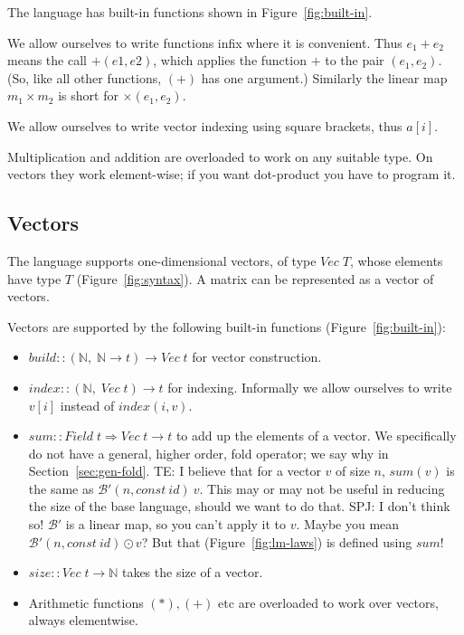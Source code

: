 \documentclass[sigplan,review]{acmart}
\renewcommand{\to}{\rightarrow}    %
\newcommand{\buildfun}{\mathit{build}}
\newcommand{\sumfunname}{\mathit{sum}}   %
\newcommand{\sumfun}[1]{\sumfunname(#1)}   %
\newcommand{\sizefun}{size}
\newcommand{\deltafun}{\delta}
\newcommand{\indexfunname}{\mathit{index}}
\newcommand{\indexfun}[2]{\indexfunname(#2,#1)} %
\renewcommand{\vector}[1]{\mathit{Vec}\;#1}
\newcommand{\nat}{\mathbb{N}}        %
\newcommand{\darrow}{\Rightarrow}    %
\newcommand{\lmapply}{\odot}   %
\newcommand{\lmcomp}{\,\circ\,}   %
\newcommand{\lmpair}{\times}         %
\newcommand{\lmbuildt}{\mathcal B'}             %
\newcommand{\simon}[1]{{\color{red}SPJ: #1}}
\newcommand{\tom}[1]{{\color{red}TE: #1}}
\begin{document}
The language has built-in functions shown in Figure~\ref{fig:built-in}.

We allow ourselves to write functions infix where it is convenient.
Thus $e_1 + e_2$ means the call $+(e1,e2)$, which applies the function $+$ to
the pair $(e_1,e_2)$.  (So, like all other functions, $(+)$ has one argument.)
Similarly the linear map $m_1 \lmpair m_2$ is short for $\lmpair(e_1,e_2)$.

We allow ourselves to write vector indexing using square brackets, thus $a[i]$.

Multiplication and addition are overloaded to work on any suitable type.
On vectors they work element-wise; if you want dot-product you have to program it.


\subsection{Vectors}

The language supports one-dimensional vectors, of type $\vector{T}$,
whose elements have type $T$ (Figure~\ref{fig:syntax}).
A matrix can be represented as a vector of vectors.

Vectors are supported by the following built-in functions (Figure~\ref{fig:built-in}):
\begin{itemize}
\item $\buildfun :: (\nat,\; \nat \to t) \to \vector{t}$ for vector construction.
\item $\indexfunname :: (\nat,\; \vector{t}) \to t$ for indexing.  Informally we allow ourselves to write
  $v[i]$ instead of $\indexfun{v}{i}$.
\item $\sumfunname :: Field \; t \darrow \vector{t} \to t$ to add up the elements of a vector.
We specifically do not have a general, higher order, fold operator;
we say why in Section~\ref{sec:gen-fold}.
  \tom{I believe that for a vector $v$ of size $n$, $\sumfun{v}$ is the
    same as $\lmbuildt(n, const~ id)~ v$.  This may or may not be useful
    in reducing the size of the base language, should we want to do that.}
  \simon{I don't think so!  $\lmbuildt$ is a linear map, so you can't apply it to $v$.
    Maybe you mean $\lmbuildt(n, const~ id) \lmapply v$?  But that (Figure~\ref{fig:lm-laws}) is
    defined using $\sumfunname$!}
\item $\sizefun :: \vector{t} \to \nat$ takes the size of a vector.
\item Arithmetic functions $(*), (+)$ etc are overloaded to work over vectors, always elementwise.
\end{itemize}
\end{document}
